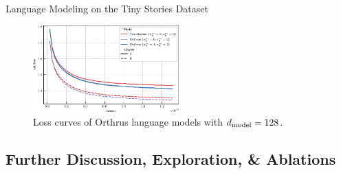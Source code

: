 \begin{table}
    \caption{Language Modeling on the Tiny Stories Dataset}\label{tab:tiny_stories_results}
    
\end{table}

\begin{figure}
    \centering
    \includegraphics[width=0.5\textwidth]{figs/experiments/tiny_stories/d128L4L6_symattn_asymra.pdf}
    \caption{Loss curves of Orthrus language models with $d_{\mathrm{model}} = 128$.}\label{fig:tiny_stories_val_loss_curves_d128}
\end{figure}

\subsection*{Further Discussion, Exploration, \& Ablations}

